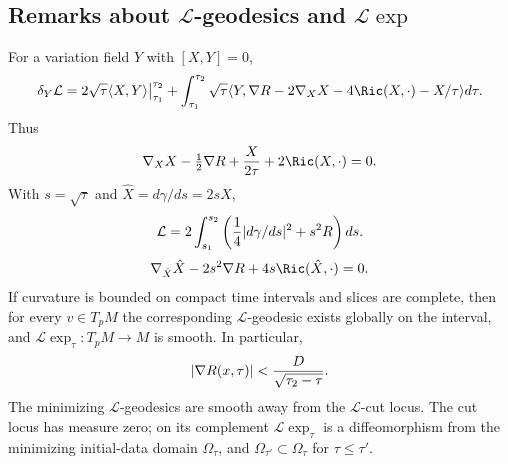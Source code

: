 \subsection{Remarks about ${\mathcal L}$-geodesics and ${\mathcal L}\exp$} \label{Lremarks}
For a variation field $Y$ with $[X,Y]=0$,
\begin{equation}\label{firstvariation}
\delta_Y{\mathcal L}=2\sqrt\tau\langle X,Y\rangle\big|_{\tau_1}^{\tau_2}
+\int_{\tau_1}^{\tau_2}\sqrt\tau\langle Y,\nabla R-2\nabla_XX-4\Ric(X,\cdot)-X/\tau\rangle d\tau.
\end{equation}
Thus
\begin{equation}\label{Lgeod}\nabla_XX-\tfrac12\nabla R+{X\over2\tau}+2\Ric(X,\cdot)=0.\end{equation}
With $s=\sqrt\tau$ and $\hat X=d\gamma/ds=2sX$,
\begin{equation}\label{changetos}
{\mathcal L}=2\int_{s_1}^{s_2}\left({1\over4}|d\gamma/ds|^2+s^2R\right)ds.
\end{equation}
\begin{equation}\label{sE-L}
\nabla_{\hat X}\hat X-2s^2\nabla R+4s\Ric(\hat X,\cdot)=0.
\end{equation}
If curvature is bounded on compact time intervals and slices are complete, then
for every $v\in T_pM$ the corresponding ${\mathcal L}$-geodesic exists globally on
the interval, and ${\mathcal L}\exp_\tau:T_pM\to M$ is smooth. In particular,
\begin{equation}\label{dr}|\nabla R(x,\tau)|<{D\over\sqrt{\tau_2-\tau}}.\end{equation}
The minimizing ${\mathcal L}$-geodesics are smooth away from the ${\mathcal L}$-cut locus.
The cut locus has measure zero; on its complement ${\mathcal L}\exp_\tau$ is a
diffeomorphism from the minimizing initial-data domain $\Omega_\tau$, and
$\Omega_{\tau'}\subset\Omega_\tau$ for $\tau\le\tau'$.

